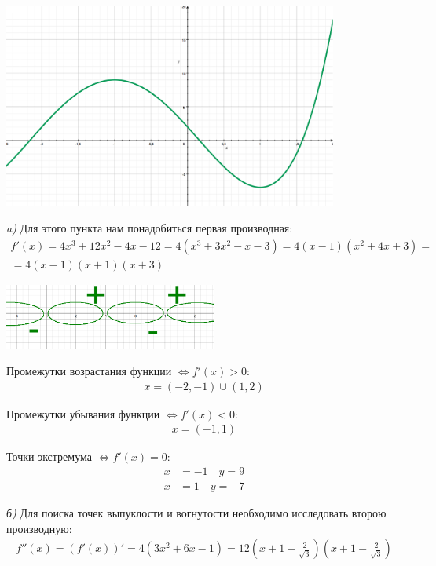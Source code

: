 \documentclass[a4paper,11pt]{article}
\begin{document}
\begin{center}
	\includegraphics[width = 110mm]{images/61.png}	
\end{center}
\textsl{a)} Для этого пункта нам понадобиться первая производная:
\begin{gather*}
	f'(x) = 4x^3 + 12x^2 - 4x - 12 = 4(x^3 + 3x^2 - x - 3) = 4(x - 1)(x^2 + 4x + 3) = \\
	= 4(x - 1)(x + 1)(x+3)
\end{gather*} 
\begin{center}
	\includegraphics[width = 70mm]{images/62.png}
\end{center}
\noindent Промежутки возрастания функции   $\Longleftrightarrow f'(x) > 0 $:
\begin{gather*}
	x = (-2, -1) \cup (1, 2)
\end{gather*}

\noindent Промежутки убывания функции   $\Longleftrightarrow f'(x) < 0 $:
\begin{gather*}
x = (-1, 1)
\end{gather*}

\noindent Точки экстремума   $\Longleftrightarrow f'(x) = 0 $:
\begin{align*}
x &= -1 \quad y = 9 \\
x &= 1  \quad y = -7 
\end{align*}

\textsl{б)} Для поиска точек выпуклости и вогнутости необходимо исследовать второю производную:
\begin{gather*}	
	f''(x) = (f'(x))' = 4(3x^2 + 6x - 1) = 12(x + 1 + \frac{2}{\sqrt{3}})(x + 1 - \frac{2}{\sqrt{3}})
\end{gather*}
\end{document}
